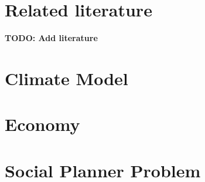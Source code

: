 \documentclass[american, abstract=off, draft]{scrartcl}
\begin{document}
\section{Related literature}
\textbf{TODO: Add literature}

\section{Climate Model}



\section{Economy}



\section{Social Planner Problem}



\nocite{*}
\newpage
\printbibliography
\end{document}
